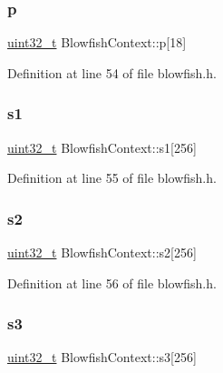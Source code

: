 \subsubsection{\texorpdfstring{p}{p}}
{\footnotesize\ttfamily \hyperlink{stdint_8h_a435d1572bf3f880d55459d9805097f62}{uint32\+\_\+t} Blowfish\+Context\+::p\mbox{[}18\mbox{]}}



Definition at line 54 of file blowfish.\+h.

\mbox{\label{structBlowfishContext_a5ea9975a381f6f68d9f779fb4bd4435e}} 
\subsubsection{\texorpdfstring{s1}{s1}}
{\footnotesize\ttfamily \hyperlink{stdint_8h_a435d1572bf3f880d55459d9805097f62}{uint32\+\_\+t} Blowfish\+Context\+::s1\mbox{[}256\mbox{]}}



Definition at line 55 of file blowfish.\+h.

\mbox{\label{structBlowfishContext_a02c1fa70573583c95087509ec5d80a51}} 
\subsubsection{\texorpdfstring{s2}{s2}}
{\footnotesize\ttfamily \hyperlink{stdint_8h_a435d1572bf3f880d55459d9805097f62}{uint32\+\_\+t} Blowfish\+Context\+::s2\mbox{[}256\mbox{]}}



Definition at line 56 of file blowfish.\+h.

\mbox{\label{structBlowfishContext_a3a258e0ef25ed4d5690c846da3ffd5dd}} 
\subsubsection{\texorpdfstring{s3}{s3}}
{\footnotesize\ttfamily \hyperlink{stdint_8h_a435d1572bf3f880d55459d9805097f62}{uint32\+\_\+t} Blowfish\+Context\+::s3\mbox{[}256\mbox{]}}



